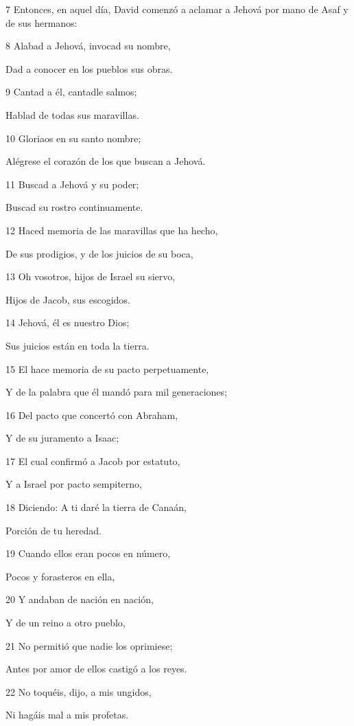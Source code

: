 \par 7 Entonces, en aquel día, David comenzó a aclamar a Jehová por mano de Asaf y de sus hermanos:
\par 8 Alabad a Jehová, invocad su nombre,
\par Dad a conocer en los pueblos sus obras.
\par 9 Cantad a él, cantadle salmos;
\par Hablad de todas sus maravillas.
\par 10 Gloriaos en su santo nombre;
\par Alégrese el corazón de los que buscan a Jehová. 
\par 11 Buscad a Jehová y su poder;
\par Buscad su rostro continuamente.
\par 12 Haced memoria de las maravillas que ha hecho, 
\par De sus prodigios, y de los juicios de su boca,
\par 13 Oh vosotros, hijos de Israel su siervo,
\par Hijos de Jacob, sus escogidos. 
\par 14 Jehová, él es nuestro Dios;
\par Sus juicios están en toda la tierra.
\par 15 El hace memoria de su pacto perpetuamente,
\par Y de la palabra que él mandó para mil generaciones; 
\par 16 Del pacto que concertó con Abraham, 
\par Y de su juramento a Isaac; 
\par 17 El cual confirmó a Jacob por estatuto,
\par Y a Israel por pacto sempiterno,
\par 18 Diciendo: A ti daré la tierra de Canaán,
\par Porción de tu heredad. 
\par 19 Cuando ellos eran pocos en número,
\par Pocos y forasteros en ella,
\par 20 Y andaban de nación en nación,
\par Y de un reino a otro pueblo,
\par 21 No permitió que nadie los oprimiese;
\par Antes por amor de ellos castigó a los reyes. 
\par 22 No toquéis, dijo, a mis ungidos,
\par Ni hagáis mal a mis profetas. 
